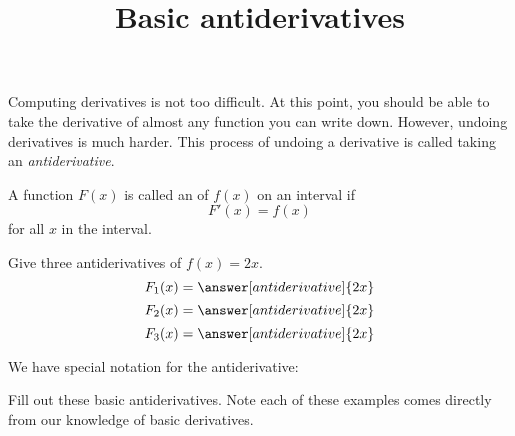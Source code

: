 \documentclass{ximera}
\title[Dig-In:]{Basic antiderivatives}
\begin{document}
\begin{abstract}
\end{abstract}
\maketitle


Computing derivatives is not too difficult. At this point, you should
be able to take the derivative of almost any function you can write
down. However, undoing derivatives is much harder. This process of
undoing a derivative is called taking an \textit{antiderivative}.

\begin{definition}
A function $F(x)$ is called an  of $f(x)$ on an
interval if
\[
F'(x) = f(x)
\]
for all $x$ in the interval.
\end{definition}

\begin{question}
  Give three antiderivatives of $f(x) = 2x$.  
  \[F_1(x) = \answer[antiderivative]{2x} \]
  \[F_2(x) = \answer[antiderivative]{2x} \]
  \[F_3(x) = \answer[antiderivative]{2x} \]
\end{question}

We have special notation for the antiderivative:

Fill out these basic antiderivatives. Note each of these examples comes
directly from our knowledge of basic derivatives.
\end{document}
